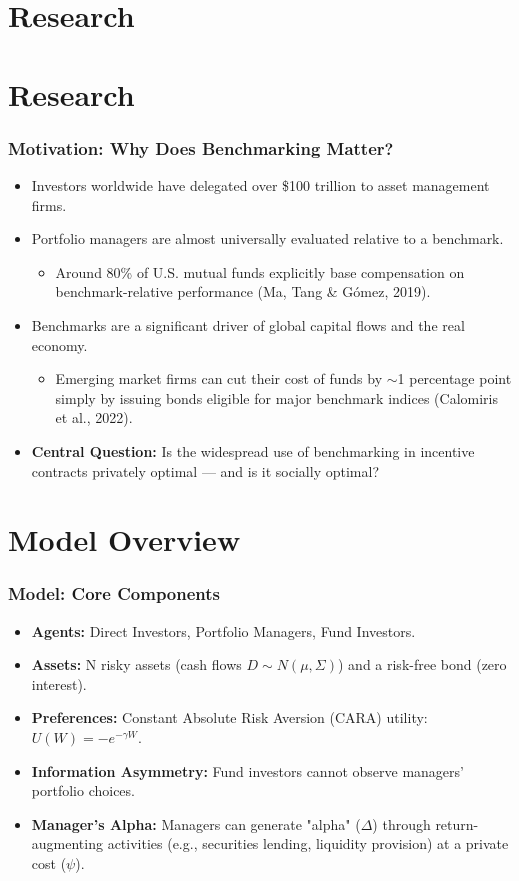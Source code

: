 \documentclass{beamer} %
\begin{document}
	\section{Research}
	
\section{Research}

\begin{frame}
	\frametitle{Motivation: Why Does Benchmarking Matter?}
	\begin{itemize}
		\item Investors worldwide have delegated over \$100 trillion to asset management firms.
		\item Portfolio managers are almost universally evaluated relative to a benchmark.
		\begin{itemize}
			\item Around 80\% of U.S. mutual funds explicitly base compensation on benchmark-relative performance (Ma, Tang \& G\'{o}mez, 2019).
		\end{itemize}
		\item Benchmarks are a significant driver of global capital flows and the real economy.
		\begin{itemize}
			\item Emerging market firms can cut their cost of funds by $\sim$1 percentage point simply by issuing bonds eligible for major benchmark indices (Calomiris et al., 2022).
		\end{itemize}
		\item \textbf{Central Question:} Is the widespread use of benchmarking in incentive contracts privately optimal — and is it socially optimal?
	\end{itemize}
\end{frame}
	
	\section{Model Overview}
	\begin{frame}
		\frametitle{Model: Core Components}
		\begin{itemize}
			\item \textbf{Agents:} Direct Investors, Portfolio Managers, Fund Investors.
			\item \textbf{Assets:} N risky assets (cash flows $D \sim N(\mu, \Sigma)$) and a risk-free bond (zero interest).
			\item \textbf{Preferences:} Constant Absolute Risk Aversion (CARA) utility: $U(W) = -e^{-\gamma W}$.
			\item \textbf{Information Asymmetry:} Fund investors cannot observe managers' portfolio choices.
			\item \textbf{Manager's Alpha:} Managers can generate "alpha" ($\Delta$) through return-augmenting activities (e.g., securities lending, liquidity provision) at a private cost ($\psi$).
		\end{itemize}
	\end{frame}
	
\end{document}
